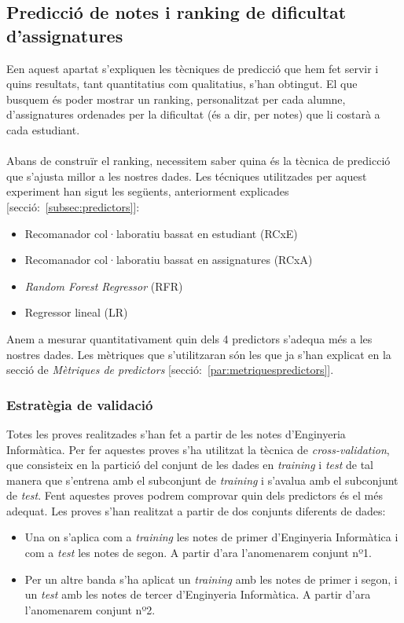 \documentclass[12pt,a4paper,catalan]{article}
\begin{document}
\newpage

\subsection{Predicció de notes i ranking de dificultat d'assignatures}
Een aquest apartat s'expliquen  les tècniques de predicció que hem fet servir i quins resultats, tant quantitatius com qualitatius, s'han obtingut. El que busquem és poder mostrar un ranking, personalitzat per cada alumne, d'assignatures ordenades per la dificultat (és a dir, per notes) que li costarà a cada estudiant.
\\
\\
Abans de construïr el ranking, necessitem saber quina és la tècnica de predicció que s'ajusta millor a les nostres dades. Les técniques utilitzades per aquest experiment han sigut les següents, anteriorment explicades [secció:~\ref{subsec:predictors}]:

\begin{itemize}[leftmargin=.5in]
	\item Recomanador col·laboratiu bassat en estudiant (RCxE)
	\item Recomanador col·laboratiu bassat en assignatures (RCxA)
	\item \textit{Random Forest Regressor} (RFR)
	\item Regressor lineal (LR)
\end{itemize}

Anem a mesurar quantitativament quin dels 4 predictors s'adequa més a les nostres dades. Les mètriques que s'utilitzaran són les que ja s'han explicat en la secció de \textit{Mètriques de predictors} [secció:~\ref{par:metriquespredictors}].

\subsubsection{Estratègia de validació}
Totes les proves realitzades s'han fet a partir de les notes d'Enginyeria Informàtica. Per fer aquestes proves s'ha utilitzat la tècnica de \textit{cross-validation}, que  consisteix en la partició del conjunt de les dades en \textit{training} i \textit{test} de tal manera que s'entrena amb el subconjunt de \textit{training} i s'avalua amb el subconjunt de \textit{test}. Fent aquestes proves podrem comprovar quin dels predictors és el més adequat. Les proves s'han realitzat a partir de dos conjunts diferents de dades:

\begin{itemize}[leftmargin=.5in]
	\item Una on s'aplica com a \textit{training} les notes de primer d'Enginyeria Informàtica i com a \textit{test} les notes de segon. A partir d'ara l'anomenarem conjunt nº1.
	\item Per un altre banda s'ha aplicat un \textit{training} amb les notes de primer i segon, i un \textit{test} amb les notes de tercer d'Enginyeria Informàtica. A partir d'ara l'anomenarem conjunt nº2.
\end{itemize}
\end{document}
